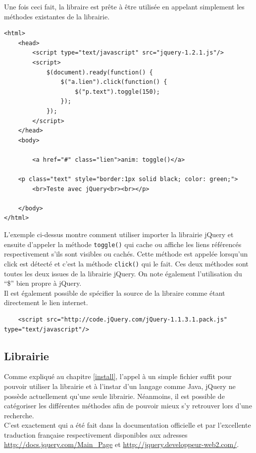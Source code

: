 \documentclass[10pt,a4paper,titlepage]{article}
\begin{document}
Une fois ceci fait, la libraire est prête à être utilisée en appelant simplement les méthodes existantes de la librairie.

\begin{lstlisting}
<html>
	<head>
		<script type="text/javascript" src="jquery-1.2.1.js"/>
		<script>
			$(document).ready(function() {		
				$("a.lien").click(function() {
					$("p.text").toggle(150);
				});
			});
		</script>
	</head>
	<body>

		<a href="#" class="lien">anim: toggle()</a>

	<p class="text" style="border:1px solid black; color: green;">
		<br>Teste avec jQuery<br><br></p>
		
	</body>
</html>
\end{lstlisting}

L'exemple ci-dessus montre comment utiliser importer la librairie jQuery et ensuite d'appeler la méthode \texttt{toggle()} qui cache ou affiche les liens référencés respectivement s'ils sont visibles ou cachés. Cette méthode est appelée lorsqu'un click est détecté et c'est la méthode \texttt{click()} qui le fait. Ces deux méthodes sont toutes les deux issues de la librairie jQuery. On note également l'utilisation du “\$” bien propre à jQuery.\\

Il est également possible de spécifier la source de la libraire comme étant directement le lien internet.
\begin{lstlisting}
	<script src="http://code.jQuery.com/jQuery-1.1.3.1.pack.js" type="text/javascript"/>
\end{lstlisting}

\subsection{Librairie}
Comme expliqué au chapitre \ref{install}, l'appel à un simple fichier suffit pour pouvoir utiliser la librairie et à l'instar d'un langage comme Java, jQuery ne possède actuellement qu'une seule librairie. Néanmoins, il est possible de catégoriser les différentes méthodes afin de pouvoir mieux s'y retrouver lors d'une recherche.\\

C'est exactement qui a été fait dans la documentation officielle et par l'excellente traduction française respectivement disponibles aux adresses \url{http://docs.jquery.com/Main_Page} et \url{http://jquery.developpeur-web2.com/}.\\
\end{document}
